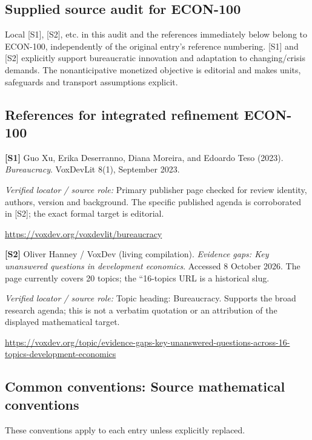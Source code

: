 \documentclass[11pt,a4paper]{article}
\begin{document}
\subsection*{Supplied source audit for ECON-100}
Local [S1], [S2], etc. in this audit and the references immediately below
belong to ECON-100, independently of the original entry's reference numbering.
[S1] and [S2] explicitly support bureaucratic innovation and adaptation to changing/crisis demands. The nonanticipative monetized objective is editorial and makes units, safeguards and transport assumptions explicit.
\subsection*{References for integrated refinement ECON-100}
{\footnotesize\raggedright
\par\noindent\textbf{[S1]} Guo Xu, Erika Deserranno, Diana Moreira, and Edoardo Teso (2023). \emph{Bureaucracy}. VoxDevLit 8(1), September 2023.\par \textit{Verified locator / source role:} Primary publisher page checked for review identity, authors, version and background. The specific published agenda is corroborated in [S2]; the exact formal target is editorial.\par \url{https://voxdev.org/voxdevlit/bureaucracy}\par\smallskip
\par\noindent\textbf{[S2]} Oliver Hanney / VoxDev (living compilation). \emph{Evidence gaps: Key unanswered questions in development economics}. Accessed 8 October 2026. The page currently covers 20 topics; the ``16-topics URL is a historical slug.\par \textit{Verified locator / source role:} Topic heading: Bureaucracy. Supports the broad research agenda; this is not a verbatim quotation or an attribution of the displayed mathematical target.\par \url{https://voxdev.org/topic/evidence-gaps-key-unanswered-questions-across-16-topics-development-economics}\par\smallskip
}

\subsection*{Common conventions: Source mathematical conventions}

These conventions apply to each entry unless explicitly replaced.
\end{document}
